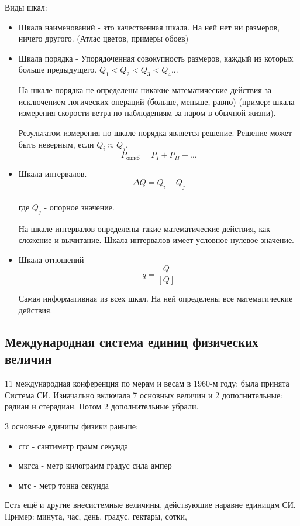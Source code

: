 \documentclass[a4paper, 12pt]{article}
\begin{document}
Виды шкал:
\begin{itemize}
	\item Шкала наименований - это качественная шкала. На ней нет ни размеров,
    ничего другого. (Атлас цветов, примеры обоев)
	\item Шкала порядка - Упорядоченная совокупность размеров, каждый из которых
    больше предыдущего. \( Q_1 < Q_2 < Q_3 < Q_4... \)

    На шкале порядка не определены никакие математические действия за
    исключением логических операций (больше, меньше, равно) (пример: шкала
    измерения скорости ветра по наблюдениям за паром в обычной жизни).

    Результатом измерения по шкале порядка является решение. Решение может
    быть неверным, если \( Q_i \approx Q_j \).\\
    \[ P_\text{ошиб} = P_I + P_{II} + \ldots \]
    \item Шкала интервалов.
      \[ \Delta Q = Q_i - Q_j \]\\
      где \( Q_j \) - опорное значение.

      На шкале интервалов определены такие математические действия, как сложение и
      вычитание. Шкала интервалов имеет условное нулевое значение.
    \item Шкала отношений
      \[ q = \frac{Q}{[Q]} \] 

      Самая информативная из всех шкал. На ней определены все математические
      действия.

\end{itemize}
\subsection{Международная система единиц физических величин}

11 международная конференция по мерам и весам в 1960-м году: была принята
Система СИ. Изначально включала 7 основных величин и 2 дополнительные:
радиан и стерадиан. Потом 2 дополнительные убрали.

3 основные единицы физики раньше:
\begin{itemize}
  \item сгс - сантиметр грамм секунда
  \item мкгса - метр килограмм градус сила ампер
  \item мтс - метр тонна секунда
\end{itemize}

Есть ещё и другие внесистемные величины, действующие наравне единицам СИ.
Пример: минута, час, день, градус, гектары, сотки,

\end{document}
